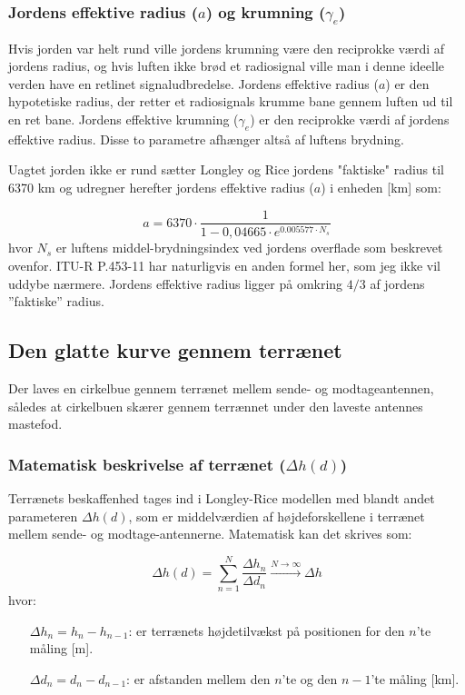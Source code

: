 \subsubsection{Jordens effektive radius ($a$) og krumning ($\gamma_e$)}
Hvis jorden var helt rund ville jordens krumning være den reciprokke værdi af jordens radius, og hvis luften ikke brød et radiosignal ville man i denne ideelle verden have en retlinet signaludbredelse. Jordens effektive radius ($a$) er den hypotetiske radius, der retter et radiosignals krumme bane gennem luften ud til en ret bane. Jordens effektive krumning ($\gamma_e$) er den reciprokke værdi af jordens effektive radius. Disse to parametre afhænger altså af luftens brydning.
\par
Uagtet jorden ikke er rund sætter Longley og Rice jordens "faktiske" radius til 6370 km og udregner herefter jordens effektive radius ($a$) i enheden [km] som:

\begin{equation}
a = 6370 \cdot \frac{1}{1-0,04665 \cdot e^{0.005577 \cdot N_s}}
\end{equation}
hvor $N_s$ er luftens middel-brydningsindex ved jordens overflade som beskrevet ovenfor. ITU-R P.453-11 har naturligvis en anden formel her, som jeg ikke vil uddybe nærmere. Jordens effektive radius ligger på omkring $4/3$ af jordens ''faktiske'' radius.

\subsection{Den glatte kurve gennem terrænet}
Der laves en cirkelbue gennem terrænet mellem sende- og modtageantennen, således at cirkelbuen skærer gennem terrænnet under den laveste antennes mastefod. 

\subsubsection{Matematisk beskrivelse af terrænet ($\Delta h(d)$)}
Terrænets beskaffenhed tages ind i Longley-Rice modellen med blandt andet parameteren $\Delta h(d)$, som er middelværdien af højdeforskellene i terrænet mellem sende- og modtage-antennerne. Matematisk kan det skrives som:

\begin{equation}
\Delta h(d) = \sum\limits_{n=1}^N \frac{\Delta h_n}{\Delta d_n} \xrightarrow {N\rightarrow \infty} \Delta h
\end{equation}
hvor:
\begin{itemize}
	\item [$\Delta h_n = h_n - h_{n-1}$:] er terrænets højdetilvækst på positionen for den $n$'te måling [m]. 
	\item [$\Delta d_n = d_n - d_{n-1}$:] er afstanden mellem den $n$'te og den $n-1$'te måling [km]. 
\end{itemize}

\FloatBarrier